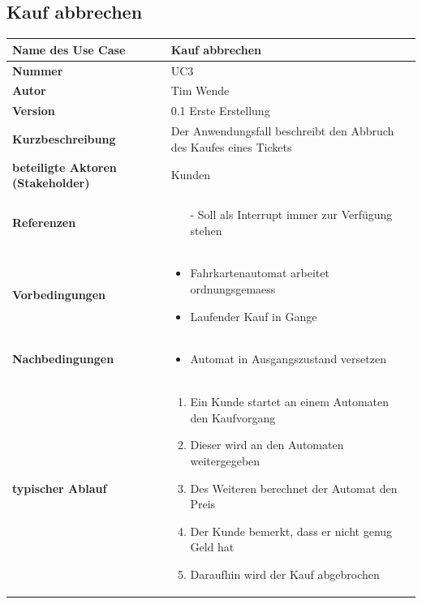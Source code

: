 \documentclass{article}
\begin{document}
    \subsection{Kauf abbrechen}
    \begin{tabularx}{\textwidth}{|l|X|}
        \hline        
        \textcolor{fhmint}{\textbf{Name des Use Case}} & \LARGE\textcolor{fhmint}{\textbf{Kauf abbrechen}}\\
        \hline
        \textbf{Nummer} & UC3 \\\hline
        \textbf{Autor} & Tim Wende \\\hline
        \textbf{Version} & 0.1 Erste Erstellung \\\hline
        \textbf{Kurzbeschreibung} & Der Anwendungsfall beschreibt den Abbruch des Kaufes eines \gls{Tickets} \\\hline
        \textbf{beteiligte Aktoren (\gls{Stakeholder})} & \gls{Kunden} \\\hline
        \textbf{Referenzen} & \begin{itemize}
            \item[-] Soll als \gls{Interrupt} immer zur Verfügung stehen
        \end{itemize} \\\hline
        \textbf{Vorbedingungen} & \begin{itemize}
            \item Fahrkartenautomat arbeitet \gls{ordnungsgemaess}
            \item Laufender Kauf in Gange
        \end{itemize} \\\hline
        \textbf{Nachbedingungen} & \begin{itemize}
            \item Automat in \gls{Ausgangszustand} versetzen
        \end{itemize} \\\hline
        \textbf{typischer Ablauf} & \begin{enumerate}
            \item Ein \gls{Kunde} startet an einem Automaten den Kaufvorgang
            \item Dieser wird an den Automaten weitergegeben
            \item Des Weiteren berechnet der Automat den Preis
            \item Der \gls{Kunde} bemerkt, dass er nicht genug Geld hat
            \item Daraufhin wird der Kauf abgebrochen

\end{enumerate}
\end{tabularx}
\end{document}
